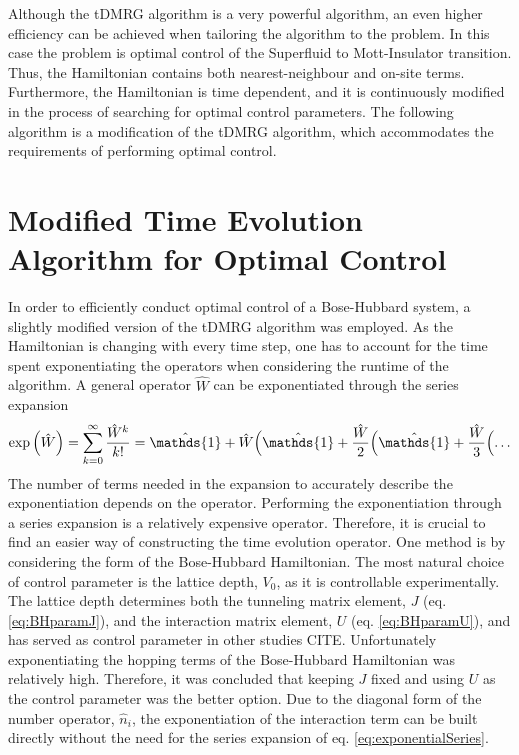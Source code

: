 Although the tDMRG algorithm is a very powerful algorithm, an even higher efficiency can be achieved when tailoring the algorithm to the problem. In this case the problem is optimal control of the Superfluid to Mott-Insulator transition. Thus, the Hamiltonian contains both nearest-neighbour and on-site terms. Furthermore, the Hamiltonian is time dependent, and it is continuously modified in the process of searching for optimal control parameters. The following algorithm is a modification of the tDMRG algorithm, which accommodates the requirements of performing optimal control.


\section{Modified Time Evolution Algorithm for Optimal Control}
\label{sec:modTMDRG}
In order to efficiently conduct optimal control of a Bose-Hubbard system, a slightly modified version of the tDMRG algorithm was employed. As the Hamiltonian is changing with every time step, one has to account for the time spent exponentiating the operators when considering the runtime of the algorithm. A general operator $\hat{W}$ can be exponentiated through the series expansion
\begin{equation}
	\exp \left( \hat{W} \right) = \sum_{k = 0}^{\infty} \frac{\hat{W}^k}{k!} = \hat{\mathds{1}} + \hat{W} \Bigl(  \hat{\mathds{1}} + \frac{\hat{W}}{2} \Bigl( \hat{\mathds{1}} + \frac{\hat{W}}{3} \Bigl( \ldots
\label{eq:exponentialSeries}
\end{equation}
The number of terms needed in the expansion to accurately describe the exponentiation depends on the operator. Performing the exponentiation through a series expansion is a relatively expensive operator. Therefore, it is crucial to find an easier way of constructing the time evolution operator.
One method is by considering the form of the Bose-Hubbard Hamiltonian. The most natural choice of control parameter is the lattice depth, $V_0$, as it is controllable experimentally. The lattice depth determines both the tunneling matrix element, $J$ (eq. \eqref{eq:BHparamJ}), and the interaction matrix element, $U$ (eq. \eqref{eq:BHparamU}), and has served as control parameter in other studies CITE.   
Unfortunately exponentiating the hopping terms of the Bose-Hubbard Hamiltonian was relatively high. Therefore, it was concluded that keeping $J$ fixed and using $U$ as the control parameter was the better option. Due to the diagonal form of the number operator, $\hat{n}_i$, the exponentiation of the interaction term can be built directly without the need for the series expansion of eq. \eqref{eq:exponentialSeries}.
